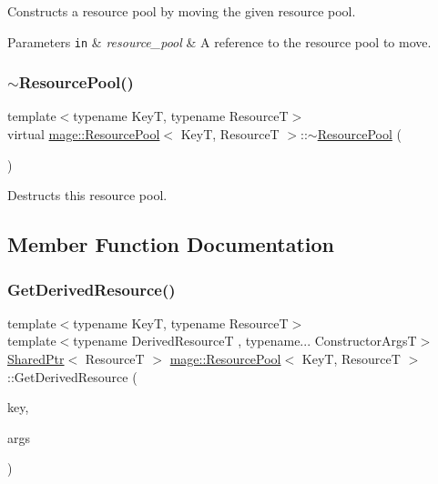 Constructs a resource pool by moving the given resource pool.


\begin{DoxyParams}[1]{Parameters}
\mbox{\tt in}  & {\em resource\+\_\+pool} & A reference to the resource pool to move. \\
\hline
\end{DoxyParams}
\hypertarget{classmage_1_1_resource_pool_ae4fff3d951818d417f77965c2db265f6}{}\label{classmage_1_1_resource_pool_ae4fff3d951818d417f77965c2db265f6} 
\subsubsection{\texorpdfstring{$\sim$\+Resource\+Pool()}{~ResourcePool()}}
{\footnotesize\ttfamily template$<$typename KeyT, typename ResourceT$>$ \\
virtual \hyperlink{classmage_1_1_resource_pool}{mage\+::\+Resource\+Pool}$<$ KeyT, ResourceT $>$\+::$\sim$\hyperlink{classmage_1_1_resource_pool}{Resource\+Pool} (\begin{DoxyParamCaption}{ }\end{DoxyParamCaption})\hspace{0.3cm}{\ttfamily [virtual]}}

Destructs this resource pool. 

\subsection{Member Function Documentation}
\hypertarget{classmage_1_1_resource_pool_a620f6e701702ace07578a5facfe86d66}{}\label{classmage_1_1_resource_pool_a620f6e701702ace07578a5facfe86d66} 
\subsubsection{\texorpdfstring{Get\+Derived\+Resource()}{GetDerivedResource()}}
{\footnotesize\ttfamily template$<$typename KeyT, typename ResourceT$>$ \\
template$<$typename Derived\+ResourceT , typename... Constructor\+ArgsT$>$ \\
\hyperlink{namespacemage_a1e01ae66713838a7a67d30e44c67703e}{Shared\+Ptr}$<$ ResourceT $>$ \hyperlink{classmage_1_1_resource_pool}{mage\+::\+Resource\+Pool}$<$ KeyT, ResourceT $>$\+::Get\+Derived\+Resource (\begin{DoxyParamCaption}\item[{const KeyT \&}]{key,  }\item[{Constructor\+ArgsT \&\&...}]{args }\end{DoxyParamCaption})}

